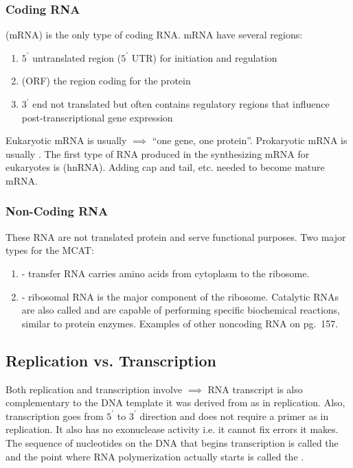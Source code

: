 \documentclass[../Bio_chemistryReview.tex]{subfiles}
\begin{document}
\subsubsection{Coding RNA}
 (mRNA) is the only type of coding RNA. mRNA have several
regions:
\begin{enumerate}
  \item $ 5^{\prime} $ untranslated region ($ 5^{\prime} $ UTR) for initiation
    and regulation
  \item {} (ORF) the region coding for the protein
  \item $ 3^{\prime} $ end not translated but often contains regulatory regions
    that influence post-transcriptional gene expression
\end{enumerate}
Eukaryotic mRNA is usually  $ \implies $ ``one gene, one
protein''. Prokaryotic mRNA is usually . The first type
of RNA produced in the synthesizing mRNA for eukaryotes is
 (hnRNA). Adding cap and tail, etc. needed to
become mature mRNA.

\subsubsection{Non-Coding RNA}
These RNA are not translated protein and serve functional purposes. Two major
types for the MCAT:
\begin{enumerate}
  \item {} - transfer RNA carries amino acids from cytoplasm to the
    ribosome.
  \item {} - ribosomal RNA is the major component of the ribosome.
    Catalytic RNAs are also called  and are capable of
    performing specific biochemical reactions, similar to protein enzymes.
    Examples of other noncoding RNA on pg.\ 157.
\end{enumerate}

\subsection{Replication vs. Transcription}
Both replication and transcription involve  $ \implies $ RNA transcript is also complementary to the DNA template it
was derived from as in replication. Also, transcription goes from $ 5^{\prime} $
to $ 3^{\prime} $ direction and does not require a primer as in replication. It
also has no exonuclease activity i.e. it cannot fix errors it makes. The
sequence of nucleotides on the DNA that begins transcription is called the
 and the point where RNA polymerization actually starts is
called the .
\end{document}
